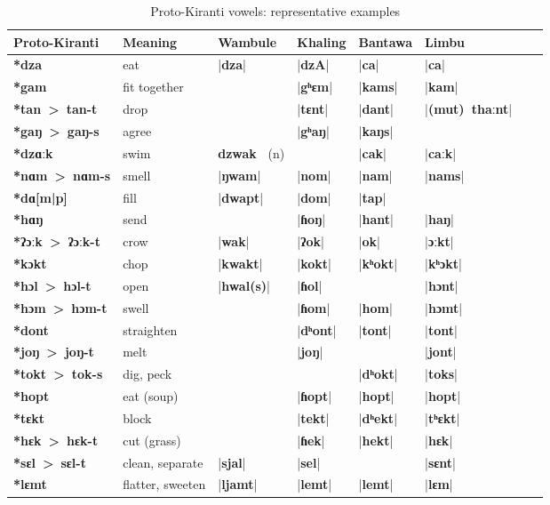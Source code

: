 \documentclass[oldfontcommands,oneside,a4paper,11pt]{article}
\newcommand{\ipa}[1]{\textbf{{\phon\mbox{#1}}}} %
\newcommand{\dhat}[1]{|\ipa{#1}|}
\begin{document}
 \begin{table}[H]
 \caption{Proto-Kiranti vowels: representative examples} \centering \label{tab:vowels.ex}
 \begin{tabular}{llllllll}
 \toprule
Proto-Kiranti & Meaning &Wambule & Khaling & Bantawa & Limbu \\
 \midrule
\ipa{*dza} &	eat &	\dhat{dza} &	\dhat{dzA} &	\dhat{ca} &	\dhat{ca} &	\\
\ipa{*gam} &	fit together &	&	\dhat{gʰɛm} &	\dhat{kams} &	\dhat{kam} &	\\
\ipa{*tan > tan-t} &	drop &	&	\dhat{tɛnt} &	\dhat{dant} &	\dhat{(mut) thaːnt} &	\\
\ipa{*gaŋ > gaŋ-s} &	agree &	&	\dhat{gʰaŋ} &	\dhat{kaŋs} &	&	\\
 \midrule						
\ipa{*dzɑːk} &	swim &	\ipa{dzwak } (n) &	&	\dhat{cak} &	\dhat{caːk} &	\\
\ipa{*nɑm > nɑm-s} &	smell &	\dhat{ŋwam} &	\dhat{nom} &	\dhat{nam} &	\dhat{nams} &	\\
\ipa{*dɑ[m|p]} &	fill &	\dhat{dwapt} &	\dhat{dom} &	\dhat{tap} &	&	\\
\ipa{*hɑŋ} &	send &	&	\dhat{ɦoŋ} &	\dhat{hant} &	\dhat{haŋ} &	\\
\midrule
\ipa{*ʔɔːk > ʔɔːk-t} &	crow &	\dhat{wak} &	\dhat{ʔok} &	\dhat{ok} &	\dhat{ɔːkt} &	\\
\ipa{*kɔkt} &	chop &	\dhat{kwakt} &	\dhat{kokt} &	\dhat{kʰokt} &	\dhat{kʰɔkt} &	\\
\ipa{*hɔl > hɔl-t} &	open &	\dhat{hwal(s)} &	\dhat{ɦol} &	&	\dhat{hɔnt} &	\\
\ipa{*hɔm > hɔm-t} &	swell &	&	\dhat{ɦom} &	\dhat{hom} &	\dhat{hɔmt} &	\\
\midrule
\ipa{*dont} &	straighten &	&	\dhat{dʰont} &	\dhat{tont} &	\dhat{tont} &	\\
\ipa{*joŋ > joŋ-t} &	melt &	&	\dhat{joŋ} &	&	\dhat{jont} &	\\
\ipa{*tokt > tok-s} &	dig, peck &	&	&	\dhat{dʰokt} &	\dhat{toks} &	\\
\ipa{*hopt} &	eat (soup) &	&	\dhat{ɦopt} &	\dhat{hopt} &	\dhat{hopt} &	\\
\midrule
\ipa{*tɛkt} &	block &	&	\dhat{tekt} &	\dhat{dʰekt} &	\dhat{tʰɛkt} &	\\
\ipa{*hɛk > hɛk-t} &	cut (grass) &	&	\dhat{ɦek} &	\dhat{hekt} &	\dhat{hɛk} &	\\
\ipa{*sɛl > sɛl-t} &	clean, separate &	\dhat{sjal} &	\dhat{sel} &	&	\dhat{sɛnt} &	\\
\ipa{*lɛmt} &	flatter, sweeten &	\dhat{ljamt} &	\dhat{lemt} &	\dhat{lemt} &	\dhat{lɛm} &	\\

\end{tabular}
\end{table}
\end{document}
